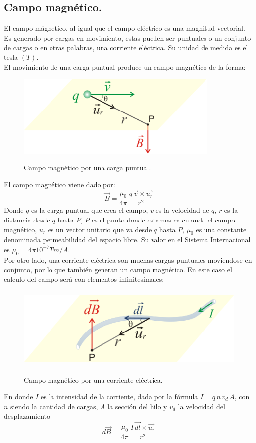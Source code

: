 \documentclass[11pt]{article}
\begin{document}
\subsection{Campo magnético.}
El campo mágnetico, al igual que el campo eléctrico es una magnitud vectorial. Es generado por cargas en movimiento, estas pueden ser puntuales o un conjunto de cargas o en otras palabras, una corriente eléctrica. Su unidad de medida es el tesla $(T)$.\\
El movimiento de una carga puntual produce un campo magnético de la forma:
\begin{figure}[H]
\caption{Campo magnético por una carga puntual.}
\centering
\includegraphics[height=4cm]{Imagenes/campomag.png}\label{fig:Campo magnetico}
\end{figure}
El campo magnético viene dado por:
$$\overrightarrow{B}=\frac{\mu_0}{4\pi}\,\frac{q\,\overrightarrow{v}\times\overrightarrow{u_r}}{r^2}$$
Donde $q$ es la carga puntual que crea el campo, $v$ es la velocidad de $q$, $r$ es la distancia desde $q$ hasta $P$, $P$ es el punto donde estamos calculando el campo magnético, $u_r$ es un vector unitario que va desde $q$ hasta $P$, $μ_0$ es una constante denominada permeabilidad del espacio libre. Su valor en el Sistema Internacional es $μ_0 = 4 \pi 10^{-7} T m/A$.\\
Por otro lado, una corriente eléctrica son muchas cargas puntuales moviendose en conjunto, por lo que también generan un campo magnético. En este caso el calculo del campo será con elementos infinitesimales:
\begin{figure}[H]
\caption{Campo magnético por una corriente eléctrica.}
\centering
\includegraphics[height=4cm]{Imagenes/campomag_corr.png}\label{fig:Campo magnetico por una corriente}
\end{figure}
En donde $I$ es la intensidad de la corriente, dada por la fórmula $I=q\,n\,v_d\,A$, con $n$ siendo la cantidad de cargas, $A$ la sección del hilo y $v_d$ la velocidad del desplazamiento.
$$d\overrightarrow{B}=\frac{μ_0}{4\pi}\, \frac{I\,\overrightarrow{dl}\times \overrightarrow{u_r}}{r^2} $$
\end{document}
